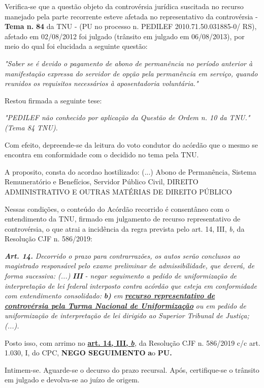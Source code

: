 \documentclass[12pt]{article}
\begin{document}
\justifying
\noindent Verifica-se que a questão objeto da controvérsia jurídica suscitada no recurso manejado pela parte recorrente esteve afetada no representativo da controvérsia - \textbf{Tema n. }\textbf{84} da TNU - (PU no processo n. PEDILEF 2010.71.50.031885-0/ RS),  afetado em 02/08/2012 foi julgado (trânsito em julgado em 06/08/2013), por meio do qual foi elucidada a seguinte questão:

\noindent \textit{"Saber se é devido o pagamento de abono de permanência no período anterior à manifestação expressa do servidor de opção pela permanência em serviço, quando reunidos os requisitos necessários à aposentadoria voluntária."}

\noindent Restou firmada a seguinte tese:

\noindent \textit{"PEDILEF não conhecido por aplicação da Questão de Ordem n. 10 da TNU." (Tema 84 TNU).}

\noindent Com efeito, depreende-se da leitura do voto condutor do acórdão que o mesmo se encontra em conformidade com o decidido no  tema pela TNU.

\noindent A proposito, consta do acordao hostilizado: (...) Abono de Permanência, Sistema Remuneratório e Benefícios, Servidor Público Civil, DIREITO ADMINISTRATIVO E OUTRAS MATÉRIAS DE DIREITO PÚBLICO

\noindent Nessas condições, o conteúdo do Acórdão recorrido é consentâneo com o entendimento da TNU, firmado em julgamento de recurso representativo de controvérsia, o que atrai a incidência da regra prevista pelo art. 14, III, \textit{b,} da Resolução CJF n. 586/2019:

\noindent \textit{\textbf{Art. 14.}}\textit{ Decorrido o prazo para contrarrazões, os autos serão conclusos ao magistrado responsável pelo exame preliminar de admissibilidade, que deverá, de forma sucessiva: (...) }\textit{\textbf{III }}\textit{- negar seguimento a pedido de uniformização de interpretação de lei federal interposto contra acórdão que esteja em conformidade com entendimento consolidado: }\textit{\textbf{b)}}\textit{ em }\uline{\textit{\textbf{recurso representativo de controvérsia pela Turma Nacional de Uniformização}}}\textit{ ou em pedido de uniformização de interpretação de lei dirigido ao Superior Tribunal de Justiça;(...).}

\noindent Posto isso, com arrimo no \uline{\textbf{art. 14, III, }}\uline{\textit{\textbf{b}}}\textit{,} da Resolução CJF n. 586/2019 c/c art. 1.030, I, do CPC, \textbf{NEGO SEGUIMENTO }\textbf{a}o\textbf{ PU}\textbf{.}

\noindent Intimem-se. Aguarde-se o decurso do prazo recursal. Após, certifique-se o trânsito em julgado e devolva-se ao juízo de origem.
\end{document}
